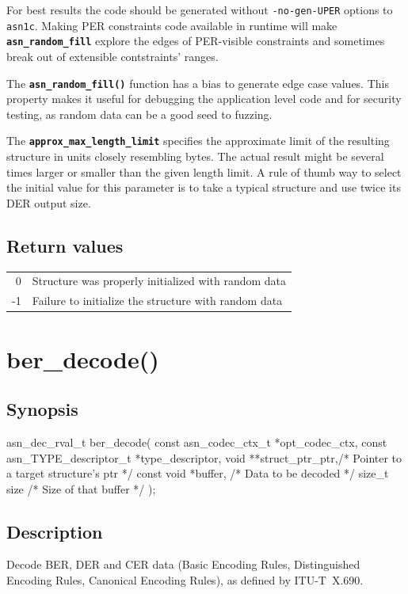 \documentclass[english,oneside,12pt]{book}
\newcommand{\apisection}[2]{\clearpage\section{\label{#1}#2}}
\newcommand{\code}[1]{\texttt{\textbf{\lstinline{#1}}}}
\newcommand{\cmd}[1]{\texttt{#1}}
\begin{document}
For best results the code should be generated without \cmd{-no-gen-UPER}
options to \cmd{asn1c}. Making PER constraints code available in runtime
will make \code{asn_random_fill} explore the edges of PER-visible constraints
and sometimes break out of extensible contstraints' ranges.

The \code{asn_random_fill()} function has a bias to generate edge case
values. This property makes it useful for debugging the application level
code and for security testing, as random data can be a good seed to fuzzing.

The \code{approx_max_length_limit} specifies the approximate limit of the
resulting structure in units closely resembling bytes. The actual result
might be several times larger or smaller than the given length limit.
A rule of thumb way to select the initial value for this parameter
is to take a typical structure and use twice its DER output size.

\subsection*{Return values}

\begin{tabular}[h!]{rl}
0 & Structure was properly initialized with random data \\
-1 & Failure to initialize the structure with random data
\end{tabular}

\apisection{sec:ber_decode}{ber\_decode()}

\subsection*{Synopsis}
\begin{signature}
asn_dec_rval_t ber_decode(
    const asn_codec_ctx_t *opt_codec_ctx,
    const asn_TYPE_descriptor_t *type_descriptor,
    void **struct_ptr_ptr,/* Pointer to a target structure's ptr */
    const void *buffer,   /* Data to be decoded */
    size_t size           /* Size of that buffer */
);
\end{signature}

\subsection*{Description}

Decode BER, DER and CER data
(Basic Encoding Rules, Distinguished Encoding Rules, Canonical Encoding Rules),
as defined by ITU-T~X.690.
\end{document}
